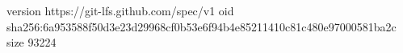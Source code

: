 version https://git-lfs.github.com/spec/v1
oid sha256:6a953588f50d3e23d29968cf0b53e6f94b4e85211410c81c480e97000581ba2c
size 93224
